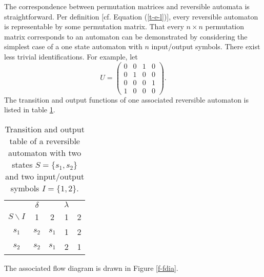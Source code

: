 The correspondence between permutation matrices and
reversible automata is straightforward. Per definition [cf. Equation
(\ref{t-e-l})], every reversible automaton is representable by some
permutation matrix. That every $n\times n$ permutation matrix
corresponds to an automaton can be demonstrated by
considering the simplest
case of a one state automaton with $n$ input/output symbols.
There exist less trivial identifications. For example,
let $$  {U}=
\left(
\begin{array}{cccc}
0&0&1&0\\
0&1&0&0\\
0&0&0&1\\
1&0&0&0
\end{array}
\right).
$$
The transition and output functions of one associated reversible
automaton is listed in table
\ref{t-ra}.
\begin{table}
\begin{center}
\begin{tabular}{|c|cc|cc|}
 \hline
 \hline
 &$\delta$ & & $\lambda$&\\
$S\backslash I$ &1&2& 1&2\\
 \hline
$s_1$&$s_2$&$s_1$ & 1&2\\
$s_2$&$s_2$&$s_1 $& 2&1\\
 \hline
 \hline
\end{tabular}
\end{center}
\caption{Transition and output table of a reversible
automaton with two states $S=\{s_1, s_2\}$ and two input/output
symbols $I= \{1,2\}$.\label{t-ra}}
\end{table}
The associated flow diagram is drawn in Figure \ref{f-fdia}.
